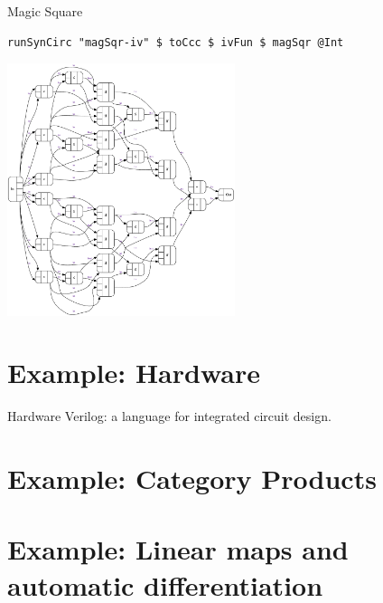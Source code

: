 \documentclass[10pt]{beamer}
\theoremstyle{definition}
\theoremstyle{remark}
\numberwithin{equation}{section}
\begin{document}
\begin{frame}[fragile]{Magic Square}
  \begin{lstlisting}[frame=single]
    runSynCirc "magSqr-iv" $ toCcc $ ivFun $ magSqr @Int
  \end{lstlisting}
  \begin{center}
    \includegraphics[width=0.5\textwidth]{magSqr-iv.pdf}
  \end{center}
\end{frame}

\section{Example: Hardware} %

\begin{frame}[fragile]{Hardware}
  Verilog: a language for integrated circuit design.
\end{frame}

\begin{frame}[fragile]{}
\end{frame}

\section{Example: Category Products} %

\begin{frame}[fragile]{}
\end{frame}

\begin{frame}[fragile]{}
\end{frame}


\section{Example: Linear maps and automatic differentiation} %
\end{document}
